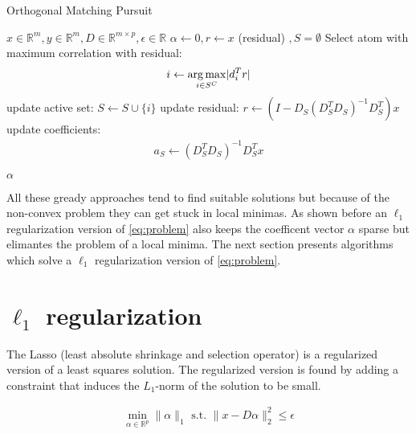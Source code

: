 \begin{algorithm}
\caption{Orthogonal Matching Pursuit}
\label{alg:omp}
\begin{algorithmic}[1]
\REQUIRE $x \in \mathbb{R}^m, y \in \mathbb{R}^m, D \in \mathbb{R}^{m\times p}, \epsilon \in \mathbb{R}$
\STATE $\alpha \gets 0, r \gets x $ (residual) $, S=\emptyset$
\STATE Select atom with maximum correlation with residual: 
\begin{equation*}
i \gets \operatorname*{arg\,max}_{i \in S^C} \lvert d_i^Tr \rvert
\end{equation*}
\STATE update active set: $S \gets S \cup \{i\} $
\STATE update residual: $r \gets \left(I-D_S\left( D_S^T D_S \right)^{-1} D_S^T \right)x$
\STATE update coefficients: 
\begin{align}
a_S \gets \left( D_S^T D_S \right)^{-1} D_S^T x  \label{eq:omp_update}
\end{align}

\ENDFOR
\RETURN $\alpha$
\end{algorithmic}
\end{algorithm}


All these gready approaches tend to find suitable solutions but because of the non-convex problem they can get stuck in local minimas.
As shown before an $\ell_1$ regularization version of \ref{eq:problem} also keeps the coefficent vector $\alpha$ sparse but elimantes the problem of a local minima.
The next section presents algorithms which solve  a $\ell_1$ regularization version of \ref{eq:problem}.



\section {$\ell_1$ regularization}



The Lasso (least absolute shrinkage and selection operator) is a regularized version of a least squares solution.
The regularized version is found by adding a constraint that induces the $L_1$-norm of the solution to be small. \cite{Tibshirani1998}

\begin{align}
\min_{\alpha\in\mathbb{R}^{p}}   \lVert \alpha \rVert_{1}   \textrm{ s.t. } \lVert x - D\alpha \rVert^{2}_{2} \leq \epsilon\label{eq:l1}
\end{align}

